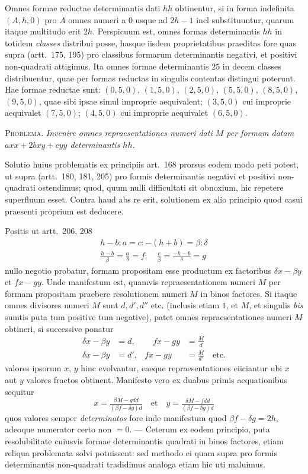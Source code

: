 Omnes formae reductae determinantis dati $hh$ obtinentur, si in forma indefinita $(A,h,0)$ pro $A$ omnes numeri a $0$ usque ad $2h-1$ incl substituuntur, quarum itaque multitudo erit $2h$. Perspicuum est, omnes formas determinantis $hh$ in totidem \textit{classes} distribui posse, hasque iisdem proprietatibus praeditas fore quas supra (artt.~175, 195) pro classibus formarum determinantis negativi, et positivi non-quadrati attigimus. Ita omnes formae determinantis $25$ in decem classes distribuentur, quae per formas reductas in singulis contentas distingui poterunt. Hae formae reductae sunt: $(0,5,0)$, $(1,5,0)$, $(2,5,0)$, $(5,5,0)$, $(8,5,0)$, $(9,5,0)$, quae sibi ipsae simul improprie aequivalent; $(3,5,0)$ cui improprie aequivalet $(7,5,0)$; $(4,5,0)$ cui improprie aequivalet $(6,5,0)$.

\textsc{Problema.} \textit{Invenire omnes repraesentationes numeri dati $M$ per formam datam $axx+2bxy+cyy$ determinantis $hh$.}

Solutio huius problematis ex principiis art.~168 prorsus eodem modo peti potest, ut supra (artt.~180, 181, 205) pro formis determinantis negativi et positivi non-quadrati ostendimus; quod, quum nulli difficultati sit obnoxium, hic repetere superfluum esset. Contra haud abs re erit, solutionem ex alio principio quod casui praesenti proprium est deducere.

Positis ut artt.~206, 208
\[
\begin{gathered}
h-b:a=c:-(h+b)=\beta:\delta\\
\frac{h-b}{\beta}=\frac a\delta=f;\quad
\frac c\beta=\frac{-h-b}{\delta}=g
\end{gathered}
\]
nullo negotio probatur, formam propositam esse productum ex factoribus $\delta x-\beta y$ et $fx-gy$. Unde manifestum est, quamvis repraesentationem numeri $M$ per formam propositam praebere resolutionem numeri $M$ in binos factores. Si itaque omnes divisores numeri $M$ sunt $d,d',d''$ etc. (inclusis etiam $1$, et $M$, et singulis \textit{bis} sumtis puta tum positive tum negative), patet omnes repraesentationes numeri $M$ obtineri, si successive ponatur
\[
\begin{aligned}
\delta x-\beta y&=d,&\quad fx-gy&=\frac M d\\
\delta x-\beta y&=d',& fx-gy&=\frac M{d'}\quad\text{etc.}
\end{aligned}
\]
valores ipsorum $x$, $y$ hinc evolvantur, eaeque repraesentationes eiiciantur ubi $x$
aut $y$ valores fractos obtinent. Manifesto vero ex duabus primis aequationibus sequitur
\[
x=\tfrac{\beta M-gdd}{(\beta f-\delta g)d}\quad\text{et}\quad
y=\tfrac{\delta M-fdd}{(\beta f-\delta g)d}
\]
quos valores semper \textit{determinatos} fore inde manifestum quod $\beta f-\delta g=2h$, adeoque numerator certo non $=0$. --- Ceterum ex eodem principio, puta resolubilitate cuiusvis formae determinantis quadrati in binos factores, etiam reliqua problemata solvi potuissent: sed methodo ei quam supra pro formis determinantis non-quadrati tradidimus analoga etiam hic uti maluimus.

